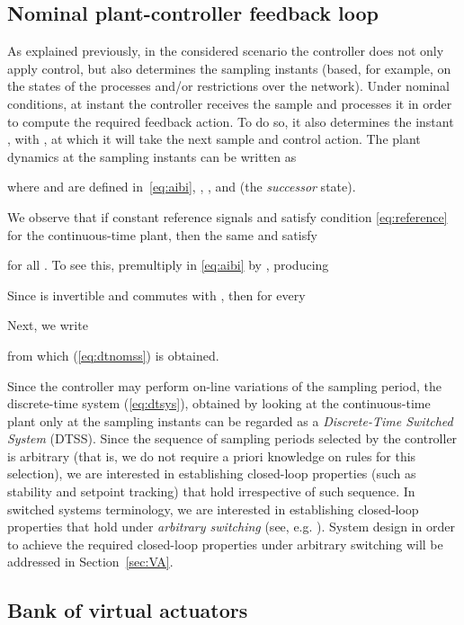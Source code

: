 \documentclass[letterpaper, 10 pt, conference]{ieeeconf}
\begin{document}
\subsection{Nominal plant-controller feedback loop}
\label{sec:nom-plant-contr}

As explained previously, in the considered scenario the controller
does not only apply control, but also determines the sampling instants
(based, for example, on the states of the processes and/or
restrictions over the network). Under nominal conditions, at instant
 the controller receives the sample  and processes it in
order to compute the required feedback action. To do so, it also
determines the instant , with , at which it will take the next sample and control
action. The plant dynamics at the sampling instants can be written as

where  and  are defined in~\eqref{eq:aibi}, ,
, and  (the \textit{successor} state).

We observe that if constant reference signals  and 
satisfy condition \eqref{eq:reference} for the continuous-time plant, then the same  and  satisfy

for all . 
To see this, premultiply  in \eqref{eq:aibi} by , producing

Since  is invertible and commutes with , then for every

  
Next, we write

from which (\ref{eq:dtnomss}) is obtained. 

Since the controller may perform on-line variations of the sampling period, the discrete-time system (\ref{eq:dtsys}), obtained by looking at the continuous-time plant only at the sampling instants can be regarded as a \emph{Discrete-Time Switched System}
(DTSS). Since the sequence of sampling periods selected by the controller is
arbitrary (that is, we do not require a priori knowledge on rules for
this selection), we are interested in establishing closed-loop properties (such as stability and setpoint tracking) that hold irrespective of such sequence. In switched systems terminology, we are interested in establishing closed-loop properties that hold under \emph{arbitrary switching} (see, e.g. \cite{showir_siamrev07,lin09:_stabil}). System design in order to achieve the required closed-loop properties under arbitrary switching will be addressed in Section~\ref{sec:VA}.



\subsection{Bank of virtual actuators}
\label{sec:bank-va}
\end{document}
